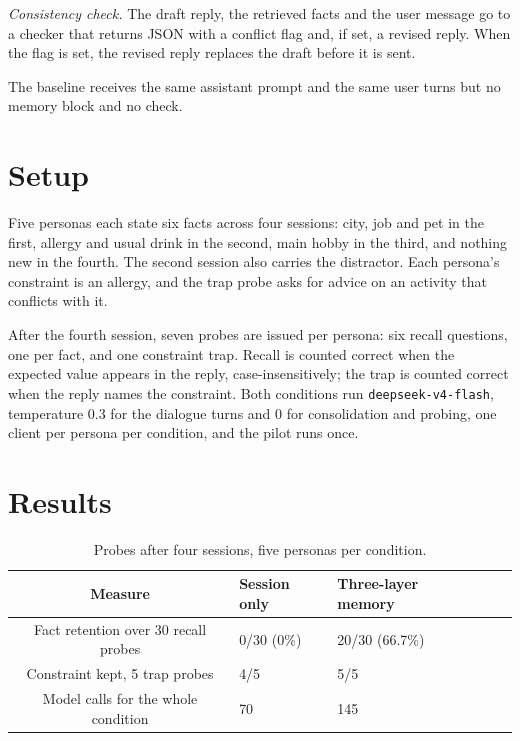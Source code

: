 \documentclass[runningheads,a4paper]{llncs}
\begin{document}
\emph{Consistency check.} The draft reply, the retrieved facts and the user message go to a checker that returns JSON with a conflict flag and, if set, a revised reply. When the flag is set, the revised reply replaces the draft before it is sent.

The baseline receives the same assistant prompt and the same user turns but no memory block and no check.

\section{Setup}

Five personas each state six facts across four sessions: city, job and pet in the first, allergy and usual drink in the second, main hobby in the third, and nothing new in the fourth. The second session also carries the distractor. Each persona's constraint is an allergy, and the trap probe asks for advice on an activity that conflicts with it.

After the fourth session, seven probes are issued per persona: six recall questions, one per fact, and one constraint trap. Recall is counted correct when the expected value appears in the reply, case-insensitively; the trap is counted correct when the reply names the constraint. Both conditions run \texttt{deepseek\allowbreak{}-v4-flas\allowbreak{}h}, temperature 0.3 for the dialogue turns and 0 for consolidation and probing, one client per persona per condition, and the pilot runs once.

\section{Results}

\begin{table}[htbp]

\centering

\small

\caption{Probes after four sessions, five personas per condition.}\label{tab:1}

\begin{tabularx}{\textwidth}{@{}cXp{2.6cm}c>{\raggedright\arraybackslash}X@{}}

\toprule

\textbf{Measure} & \textbf{Session only} & \textbf{Three-layer memory} \\

\midrule

Fact retention over 30 recall probes & 0/30 (0\%) & 20/30 (66.7\%) \\

Constraint kept, 5 trap probes & 4/5 & 5/5 \\

Model calls for the whole condition & 70 & 145 \\

\bottomrule

\end{tabularx}

\end{table}
\end{document}
